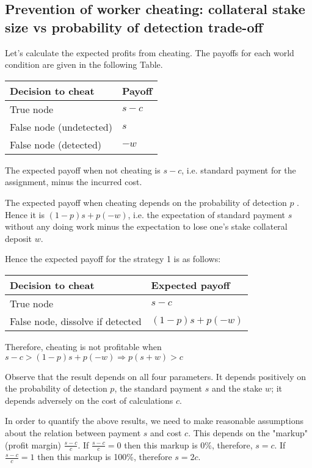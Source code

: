 \documentclass{article}
\begin{document}
\subsection{Prevention of worker cheating: collateral stake size vs
probability of detection trade-off}

Let's calculate the expected profits from cheating. The payoffs for each
world condition are given in the following Table.

\begin{tabular}{||l|l||}
\hline\hline
Decision to cheat & Payoff \\ \hline
True node & $s-c$ \\ \hline
False node (undetected) & $s$ \\ \hline
False node (detected) & $-w$ \\ \hline\hline
\end{tabular}

The expected payoff when not cheating is $s-c$, i.e. standard payment for
the assignment, minus the incurred cost.

The expected payoff when cheating depends on the probability of detection $p$%
. Hence it is $(1-p)s+p(-w)$, i.e. the expectation of standard payment $s$
without any doing work minus the expectation to lose one's stake collateral
deposit $w$.

Hence the expected payoff for the strategy 1 is as follows:

\begin{tabular}{||l|l||}
\hline\hline
Decision to cheat & Expected payoff \\ \hline
True node & $s-c$ \\ \hline
False node, dissolve if detected & $(1-p)s+p(-w)$ \\ \hline\hline
\end{tabular}

Therefore, cheating is not profitable when $s-c>(1-p)s+p(-w)\Longrightarrow
p(s+w)>c$

Observe that the result depends on all four parameters. It depends
positively on the probability of detection $p$, the standard payment $s$ and
the stake $w$; it depends adversely on the cost of calculations $c$.

In order to quantify the above results, we need to make reasonable
assumptions about the relation between payment $s$ and cost $c$. This
depends on the "markup" (profit margin) $\frac{s-c}{c}$. If $\frac{s-c}{c}=0$
then this markup is 0\%, therefore, $s=c$. If $\frac{s-c}{c}=1$ then this
markup is 100\%, therefore $s=2c$.
\end{document}
